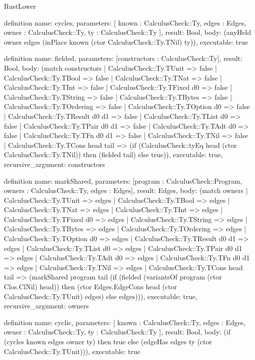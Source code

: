 \begin{lexlean}{RustLower}
\begin{semanticmodule}
definition{
  name: cycles,
  parameters: [
    known : CalculusCheck::Ty,
    edges : Edges,
    owner : CalculusCheck::Ty,
    ty : CalculusCheck::Ty
  ],
  result: Bool,
  body: (anyHeld owner edges (inPlace known (ctor CalculusCheck::Ty.TNil) ty)),
  executable: true
}

definition{
  name: fielded,
  parameters: [constructors : CalculusCheck::Ty],
  result: Bool,
  body: (match constructors
    | CalculusCheck::Ty.TUnit => false
    | CalculusCheck::Ty.TBool => false
    | CalculusCheck::Ty.TNat => false
    | CalculusCheck::Ty.TInt => false
    | CalculusCheck::Ty.TFixed d0 => false
    | CalculusCheck::Ty.TString => false
    | CalculusCheck::Ty.TBytes => false
    | CalculusCheck::Ty.TOrdering => false
    | CalculusCheck::Ty.TOption d0 => false
    | CalculusCheck::Ty.TResult d0 d1 => false
    | CalculusCheck::Ty.TList d0 => false
    | CalculusCheck::Ty.TPair d0 d1 => false
    | CalculusCheck::Ty.TAdt d0 => false
    | CalculusCheck::Ty.TFn d0 d1 => false
    | CalculusCheck::Ty.TNil => false
    | CalculusCheck::Ty.TCons head tail => (if (CalculusCheck::tyEq head (ctor CalculusCheck::Ty.TNil)) then (fielded tail) else true)),
  executable: true,
  recursive_argument: constructors
}

definition{
  name: markShared,
  parameters: [program : CalculusCheck::Program, owners : CalculusCheck::Ty, edges : Edges],
  result: Edges,
  body: (match owners
    | CalculusCheck::Ty.TUnit => edges
    | CalculusCheck::Ty.TBool => edges
    | CalculusCheck::Ty.TNat => edges
    | CalculusCheck::Ty.TInt => edges
    | CalculusCheck::Ty.TFixed d0 => edges
    | CalculusCheck::Ty.TString => edges
    | CalculusCheck::Ty.TBytes => edges
    | CalculusCheck::Ty.TOrdering => edges
    | CalculusCheck::Ty.TOption d0 => edges
    | CalculusCheck::Ty.TResult d0 d1 => edges
    | CalculusCheck::Ty.TList d0 => edges
    | CalculusCheck::Ty.TPair d0 d1 => edges
    | CalculusCheck::Ty.TAdt d0 => edges
    | CalculusCheck::Ty.TFn d0 d1 => edges
    | CalculusCheck::Ty.TNil => edges
    | CalculusCheck::Ty.TCons head tail => (markShared program tail (if (fielded (variantsOf program (ctor Clos.ClNil) head)) then (ctor Edges.EdgeCons head (ctor CalculusCheck::Ty.TUnit) edges) else edges))),
  executable: true,
  recursive_argument: owners
}

definition{
  name: cyclic,
  parameters: [
    known : CalculusCheck::Ty,
    edges : Edges,
    owner : CalculusCheck::Ty,
    ty : CalculusCheck::Ty
  ],
  result: Bool,
  body: (if (cycles known edges owner ty) then true else (edgeHas edges ty (ctor CalculusCheck::Ty.TUnit))),
  executable: true
}


\end{semanticmodule}
\end{lexlean}

